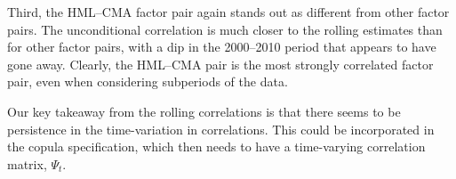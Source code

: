 Third, the HML--CMA factor pair again stands out as different from other factor pairs. The unconditional correlation is much closer to the rolling estimates than for other factor pairs, with a dip in the 2000--2010 period that appears to have gone away. Clearly, the HML--CMA pair is the most strongly correlated factor pair, even when considering subperiods of the data.

Our key takeaway from the rolling correlations is that there seems to be persistence in the time-variation in correlations. This could be incorporated in the copula specification, which then needs to have a time-varying correlation matrix, $\Psi_t$.




\label{sub:threshold_and_rolling_correlations_of_residuals}

